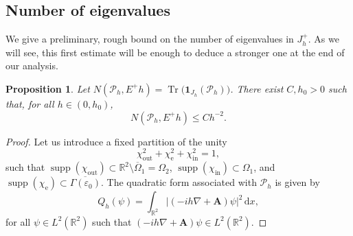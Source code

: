 \documentclass[JEP,XML,SOM,Unicode,NoFloatCountersInSection,published]{cedram}
\let\epsilon\varepsilon
\newcommand{\rd}{\,\mathrm{d}}
\newcommand{\rme}{\mathrm{e}}
\newcommand{\rin}{\mathrm{in}}
\newcommand{\out}{\mathrm{out}}
\DeclareMathOperator{\supp}{supp}
\DeclareMathOperator{\Tr}{Tr}
\newcommand{\cP}{\mathcal{P}}
\theoremstyle{plain}
\newtheorem{proposition}[theorem]{Proposition}
\theoremstyle{definition}
\newcommand{\A}{\boldsymbol{A}}
\newcommand{\R}{\mathbb{R}}
\begin{document}
\subsection{Number of eigenvalues}\label{sec.number}
We give a preliminary, rough bound on
the number of eigenvalues in $J^+_h$. As we will see, this first estimate will be enough to deduce a stronger one at the end of our analysis.
\begin{proposition}\label{prop:Nb-h}
Let $N(\cP_h, E^+h)=\Tr\bigl(\mathbf 1_{J_h}(\cP_h)\bigr)$. There exist $C,h_0>0$ such that, for all $h\in(0,h_0)$,
\[
N(\cP_h, E^+h)\leq C h^{-2}.
\]
\end{proposition}
\begin{proof}
Let us introduce a fixed partition of the unity
\[
\chi_{\out}^2+\chi_{\rme}^2+\chi_{\rin}^2=1,
\] 
such that $\supp(\chi_{\out})\subset\mathbb{R}^2\setminus\overline{\Omega}_1=\Omega_2$, $\supp(\chi_{\rin})\subset\Omega_1$, and ${\supp(\chi_{\rme})}\subset \overline{\Gamma(\epsilon_0)}$.
The quadratic form associated with $\cP_h$ is given by 
\[
Q_h(\psi)=\int_{\R^2}|(-ih\nabla+\A)\psi|^2\rd x,
\]
for all $\psi\in L^2(\R^2)$ such that $(-ih\nabla+\A)\psi\in L^2(\R^2)$.


\end{proof}
\end{document}
